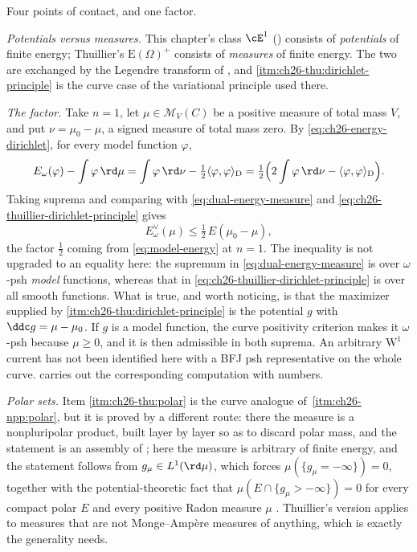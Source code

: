 \begin{remark}
\label{rem:ch26-thuillier-comparison}
Four points of contact, and one factor.

\emph{Potentials versus measures.}  This chapter's class $\cE^1$
() consists of \emph{potentials} of finite energy; Thuillier's
$\mathrm E(\Omega)^+$ consists of \emph{measures} of finite energy.  The
two are exchanged by the Legendre transform of
, and
\cref{itm:ch26-thu:dirichlet-principle} is the curve case of the variational
principle used there.

\emph{The factor.}  Take $n=1$, let $\mu\in\mathcal M_V(C)$ be a positive
measure of total mass $V$, and put $\nu=\mu_0-\mu$, a signed measure of
total mass zero.  By
\eqref{eq:ch26-energy-dirichlet}, for every model function $\varphi$,
\[
 E_\omega(\varphi)-\int\varphi\,\rd\mu
 =\int\varphi\,\rd\nu-\tfrac12\langle\varphi,\varphi\rangle_{\mathrm D}
 =\tfrac12\Bigl(2\int\varphi\,\rd\nu
        -\langle\varphi,\varphi\rangle_{\mathrm D}\Bigr).
\]
Taking suprema and comparing with \eqref{eq:dual-energy-measure} and
\eqref{eq:ch26-thuillier-dirichlet-principle} gives
\begin{equation}
\label{eq:ch26-dual-vs-thuillier}
 E^\vee_\omega(\mu)\leq\tfrac12\,E(\mu_0-\mu),
\end{equation}
the factor $\tfrac12$ coming from \eqref{eq:model-energy} at $n=1$.  The
inequality is not upgraded to an equality here: the supremum in
\eqref{eq:dual-energy-measure} is over $\omega$-psh \emph{model} functions,
whereas that in \eqref{eq:ch26-thuillier-dirichlet-principle} is over all
smooth functions.  What is true, and worth noticing, is that the maximizer
supplied by \cref{itm:ch26-thu:dirichlet-principle} is the potential $g$
with $\ddc g=\mu-\mu_0$.  If $g$ is a model function, the curve
positivity criterion makes it $\omega$-psh because $\mu\geq0$, and it is
then admissible in both suprema.  An arbitrary $\mathrm W^1$ current has
not been identified here with a BFJ psh representative on the whole curve.   carries out the
corresponding computation with numbers.

\emph{Polar sets.}  Item \cref{itm:ch26-thu:polar} is the curve analogue of
\,\cref{itm:ch26-npp:polar}, but it is proved by a
different route: there the measure is a nonpluripolar product, built layer
by layer so as to discard polar mass, and the statement is an assembly of
; here the measure is arbitrary of finite
energy, and the statement follows from $g_\mu\in L^1(\rd\mu)$, which forces
$\mu(\{g_\mu=-\infty\})=0$, together with the potential-theoretic fact that
$\mu(E\cap\{g_\mu>-\infty\})=0$ for every compact polar $E$ and every
positive Radon measure $\mu$ \cite[Th\'eor\`eme~3.4.22]{Thu05}.
Thuillier's version applies
to measures that are not Monge--Amp\`ere measures of anything, which is
exactly the generality  needs.


\end{remark}
